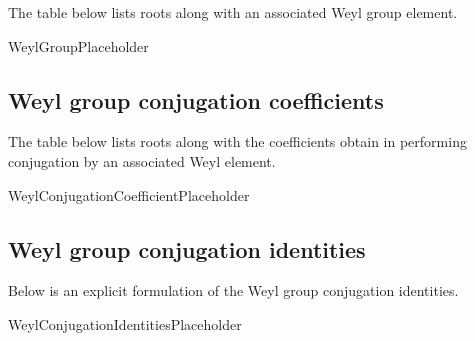 \documentclass[11pt]{article}
\newcommand{\noi}{\noindent}
\theoremstyle{definition}
\begin{document}
\noi The table below lists roots along with an associated Weyl group element.

WeylGroupPlaceholder

\subsection{Weyl group conjugation coefficients}

\noi The table below lists roots along with the coefficients obtain in performing conjugation by an associated Weyl element.

WeylConjugationCoefficientPlaceholder

\subsection{Weyl group conjugation identities}

\noi Below is an explicit formulation of the Weyl group conjugation identities.

WeylConjugationIdentitiesPlaceholder
\end{document}
